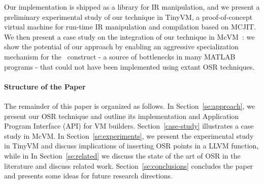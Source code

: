 Our implementation is shipped as a library for IR manipulation, and we present a preliminary experimental study of our technique in TinyVM, a proof-of-concept virtual machine for run-time IR manipulation and compilation based on MCJIT. We then present a case study on the integration of our technique in McVM~\cite{chevalier2010mcvm}: we show the potential of our approach by enabling an aggressive specialization mechanism for the \feval\ construct - a source of bottlenecks in many MATLAB programs - that could not have been implemented using extant OSR techniques.

\paragraph{Structure of the Paper}
The remainder of this paper is organized as follows. In Section~\ref{se:approach}, we present our OSR technique and outline its implementation and Application Program Interface (API) for VM builders. Section~\ref{case-study} illustrates a case study in McVM. In Section~\ref{se:experiments}, we present the experimental study in TinyVM and discuss implications of inserting OSR points in a LLVM function, while in In Section~\ref{se:related} we discuss the state of the art of OSR in the literature and discuss related work. Section~\ref{se:conclusions} concludes the paper and presents some ideas for future research directions. 
  
  
  
  
  
  
  
  
  